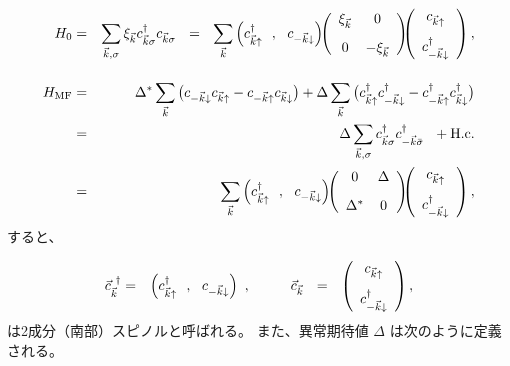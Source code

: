 \documentclass[uplatex,a4j,12pt,dvipdfmx]{jsarticle}
\begin{document}
\begin{eqnarray}
	H_{0}
	&=&
	\sum_{\vec{k},\sigma}
	\xi_{\vec{k}}
	c^{\dagger}_{\vec{k} \sigma}
	c_{\vec{k} \sigma}
	\ \ = \ \
	\sum_{\vec{k}}
	\left(
	c_{\vec{k} \uparrow}^{\dagger} \ \ , \ \
	c_{-\vec{k} \downarrow}
	\right)
	\!\!
	\left(
	\begin{array}{cc}
			\xi_{\vec{k}} & 0
			\\[3mm]
			0             & -\xi_{\vec{k}}
		\end{array}
	\right)
	\!\!\!
	\left(
	\begin{array}{c}
			c_{\vec{k} \uparrow} \\[3mm]
			c_{-\vec{k} \downarrow}^{\dagger}
		\end{array}
	\right)
	,
	\\[4mm]
	H_{\rm MF}
	&=&
	\Delta^{*}
	\sum_{\vec{k}}
	\big(
	c_{-\vec{k} \downarrow}
	c_{\vec{k} \uparrow}
	-
	c_{-\vec{k} \uparrow}
	c_{\vec{k} \downarrow}
	\big)
	+
	\Delta
	\sum_{\vec{k}}
	\big(
	c^{\dagger}_{\vec{k} \uparrow}
	c^{\dagger}_{-\vec{k} \downarrow}
	-
	c^{\dagger}_{-\vec{k} \uparrow}
	c^{\dagger}_{\vec{k} \downarrow}
	\big)
	\\ &=&
	\Delta
	\sum_{\vec{k}, \sigma}
	c^{\dagger}_{\vec{k} \sigma}
	c^{\dagger}_{-\vec{k} \bar{\sigma}}
	\ \ +
	{\rm H.c.}
	\\ &=&
	\sum_{\vec{k}}
	\left(
	c_{\vec{k} \uparrow}^{\dagger} \ \ , \ \
	c_{-\vec{k} \downarrow}
	\right)
	\!\!
	\left(
	\begin{array}{cc}
			0          & \Delta \\[3mm]
			\Delta^{*} & 0
		\end{array}
	\right)
	\!\!\!
	\left(
	\begin{array}{c}
			c_{\vec{k} \uparrow} \\[3mm]
			c_{-\vec{k} \downarrow}^{\dagger}
		\end{array}
	\right)
	,
\end{eqnarray}
%
すると、

\begin{eqnarray}
	\vec{c}^{\ \dagger}_{\vec{k}}
	&=&
	\left(
	c_{\vec{k} \uparrow}^{\dagger} \ \ , \ \
	c_{-\vec{k} \downarrow}
	\right)
	\ , \hspace{10mm}
	\vec{c}_{\vec{k}}
	\ \ = \ \
	\left(
	\begin{array}{c}
			c_{\vec{k} \uparrow} \\[3mm]
			c_{-\vec{k} \downarrow}^{\dagger}
		\end{array}
	\right)
	,
\end{eqnarray}
%
は2成分（南部）スピノルと呼ばれる。
また、異常期待値 $\Delta$ は次のように定義される。
\end{document}
